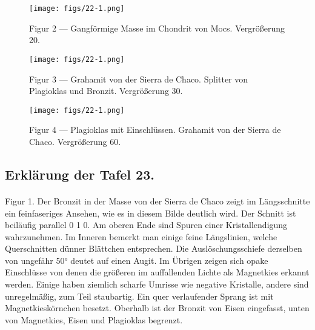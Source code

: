\documentclass[a4paper, 12pt, oneside]{article}
\begin{document}
\vspace*{\fill}
\begin{figure}[H]
\centering
\texttt{[image: figs/22-1.png]}
\caption{\small Figur 2 --- Gangförmige Masse im Chondrit von Mocs. Vergrößerung 20.}
\end{figure}
\vspace*{\fill}
\clearpage

\vspace*{\fill}
\begin{figure}[H]
\centering
\texttt{[image: figs/22-1.png]}
\caption{\small Figur 3 --- Grahamit von der Sierra de Chaco. Splitter von Plagioklas und Bronzit. Vergrößerung 30.}
\end{figure}
\vspace*{\fill}
\clearpage

\vspace*{\fill}
\begin{figure}[H]
\centering
\texttt{[image: figs/22-1.png]}
\caption{\small Figur 4 --- Plagioklas mit Einschlüssen. Grahamit von der Sierra de Chaco. Vergrößerung 60.}
\end{figure}
\vspace*{\fill} 
\clearpage

\subsection{Erklärung der Tafel 23.}
\paragraph{}
Figur 1. Der Bronzit in der Masse von der Sierra de Chaco zeigt im Längsschnitte ein feinfaseriges Ansehen, wie es in diesem Bilde deutlich wird. Der Schnitt ist beiläufig parallel 0 1 0. Am oberen Ende sind Spuren einer Kristallendigung wahrzunehmen. Im Inneren bemerkt man einige feine Längslinien, welche Querschnitten dünner Blättchen entsprechen. Die Auslöschungsschiefe derselben von ungefähr 50° deutet auf einen Augit. Im Übrigen zeigen sich opake Einschlüsse von denen die größeren im auffallenden Lichte als Magnetkies erkannt werden. Einige haben ziemlich scharfe Umrisse wie negative Kristalle, andere sind unregelmäßig, zum Teil staubartig. Ein quer verlaufender Sprang ist mit Magnetkieskörnchen besetzt. Oberhalb ist der Bronzit von Eisen eingefasst, unten von Magnetkies, Eisen und Plagioklas begrenzt.
\end{document}
